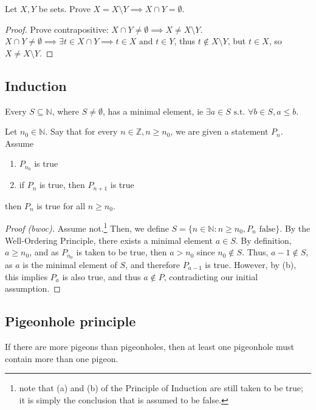 \documentclass[12pt,oneside]{article}
\begin{document}
\begin{example}
  Let $X,Y$ be sets. Prove $X = X\setminus Y \implies X \cap Y = \emptyset$.
  \begin{proof}
    Prove contrapositive: $X \cap Y \neq \emptyset \implies X \neq X \setminus Y$. $X \cap Y \neq \emptyset \implies \exists t \in X \cap Y \implies t \in X \text{ and } t \in Y$, thus $t \notin X\setminus Y$, but $t \in X$, so $X \neq X \setminus Y$.
  \end{proof}
\end{example}

\subsection{Induction}

\begin{axiom}
  Every $S \subseteq \mathbb{N}$, where $S \neq \emptyset$, has a minimal element, ie $\exists a \in S \text{ s.t. } \forall b \in S, a \leq b$.
\end{axiom}

\begin{theorem}
  Let $n_0 \in \mathbb{N}$. Say that for every $n \in \mathbb{Z}, n \geq n_0$, we are given a statement $P_n$. Assume
  \begin{enumerate}[label=(\alph*)]
    \item $P_{n_0}$ is true
    \item if $P_n$ is true, then $P_{n+1}$ is true
  \end{enumerate}
  then $P_n$ is true for all $n \geq n_0$.
\end{theorem}

\begin{proof}[Proof (bwoc)]
 Assume not.\footnote{note that (a) and (b) of the Principle of Induction are still taken to be true; it is simply the conclusion that is assumed to be false. } Then, we define $S = \{n \in \mathbb{N} : n \geq n_0, P_n \text{ false}\}$. By the Well-Ordering Principle, there exists a minimal element $a \in S$. By definition, $a \geq n_0$, and as $P_{n_0}$ is taken to be true, then $a > n_0$ since $n_0 \notin S$. Thus, $a-1 \notin S$, as $a$ is the minimal element of $S$, and therefore $P_{a-1}$ is true. However, by (b), this implies $P_{a}$ is also true, and thus $a \notin P$, contradicting our initial assumption.
\end{proof}

\subsection{Pigeonhole principle}
\begin{axiom}
  If there are more pigeons than pigeonholes, then at least one pigeonhole must contain more than one pigeon.\footnotemark
\end{axiom}
\end{document}
